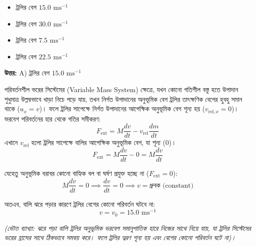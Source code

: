 \documentclass[12pt, a4paper]{article}
\begin{document}
\begin{itemize}[label={}, leftmargin=1cm, itemsep=0.5em]
\item[\textbf{A)}] ট্রলির বেগ $15.0\text{ ms}^{-1}$
\item[\textbf{B)}] ট্রলির বেগ $30.0\text{ ms}^{-1}$
\item[\textbf{C)}] ট্রলির বেগ $7.5\text{ ms}^{-1}$
\item[\textbf{D)}] ট্রলির বেগ $22.5\text{ ms}^{-1}$
\end{itemize}

\vspace{0.5em}
\begin{tcolorbox}[answerbox]
\textbf{\color{success} উত্তর:} A) ট্রলির বেগ $15.0\text{ ms}^{-1}$
\end{tcolorbox}
\vspace{1em}

\begin{tcolorbox}[solutionbox={সমাধান (Solution)}]
\noindent
পরিবর্তনশীল ভরের সিস্টেমের (Variable Mass System) ক্ষেত্রে, যখন কোনো গতিশীল বস্তু হতে উপাদান শুধুমাত্র উল্লম্বভাবে খাড়া নিচে পড়ে যায়, তখন নির্গত উপাদানের অনুভূমিক বেগ ট্রলির তাৎক্ষণিক বেগের হুবহু সমান থাকে ($u_x = v$)। ফলে ট্রলির সাপেক্ষে নির্গত উপাদানের আপেক্ষিক অনুভূমিক বেগ শূন্য হয় ($v_{\text{rel},x} = 0$)। ভরবেগ পরিবর্তনের হার থেকে গতির সমীকরণ:
$$F_{\text{ext}} = M \frac{dv}{dt} - v_{\text{rel}} \frac{dm}{dt}$$
এখানে $v_{\text{rel}}$ হলো ট্রলির সাপেক্ষে বালির আপেক্ষিক অনুভূমিক বেগ, যা শূন্য ($0$)।
$$F_{\text{ext}} = M \frac{dv}{dt} - 0 = M \frac{dv}{dt}$$

যেহেতু অনুভূমিক বরাবর কোনো বাহ্যিক বল বা ঘর্ষণ প্রযুক্ত হচ্ছে না ($F_{\text{ext}} = 0$):
$$M \frac{dv}{dt} = 0 \implies \frac{dv}{dt} = 0 \implies v = \text{ধ্রুবক (constant)}$$

অতএব, বালি ঝরে পড়ার কারণে ট্রলির বেগের কোনো পরিবর্তন ঘটবে না:
$$v = v_0 = 15.0\text{ ms}^{-1}$$

\textit{(ভৌত ব্যাখ্যা: ঝরে পড়া বালি ট্রলির অনুভূমিক ভরবেগ সমানুপাতিক হারে নিজের সাথে নিয়ে যায়, যা ট্রলির সিস্টেমের ভরের হ্রাসের সাথে ঠিকভাবে সমন্বয় করে। ফলে ট্রলির ত্বরণ শূন্য হয় এবং বেগের কোনো পরিবর্তন ঘটে না)।}
\end{tcolorbox}
\vspace{1em}
\end{document}

